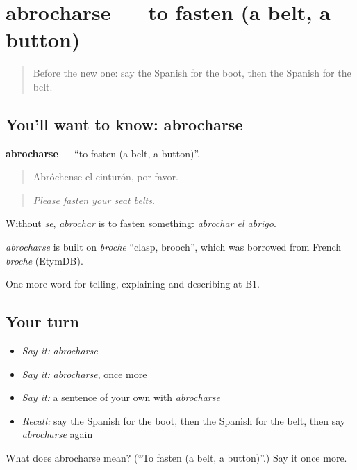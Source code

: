 \section[abrocharse]{abrocharse — to fasten (a belt, a button)}

\label{lesson:ES-C644-abrocharse}



\begin{quote}
Before the new one: say the Spanish for the boot, then the Spanish for the belt.
\end{quote}

\subsection*{You'll want to know: abrocharse}
\textbf{abrocharse} — \textquotedblleft{}to fasten (a belt, a button)\textquotedblright{}.

\begin{quote}
Abróchense el cinturón, por favor.
\end{quote}

\begin{quote}
\emph{Please fasten your seat belts.}
\end{quote}

Without \emph{se}, \emph{abrochar} is to fasten something: \emph{abrochar el abrigo}.

\begin{cousinweb}
\emph{abrocharse} is built on \emph{broche} \textquotedblleft{}clasp, brooch\textquotedblright{}, which was borrowed from French \emph{broche} (EtymDB).
\end{cousinweb}

\begin{grammarlens}[title={What you've built}]
One more word for telling, explaining and describing at B1.
\end{grammarlens}

\subsection*{Your turn}
\begin{itemize}
\raggedright
  \item \emph{Say it:} \emph{abrocharse}
  \item \emph{Say it:} \emph{abrocharse}, once more
  \item \emph{Say it:} a sentence of your own with \emph{abrocharse}
  \item \emph{Recall:} say the Spanish for the boot, then the Spanish for the belt, then say \emph{abrocharse} again
\end{itemize}

\begin{tcolorbox}[breakable,colback=teal!4,colframe=teal!35!black,title={Before you move on}]
What does abrocharse mean? (\textquotedblleft{}To fasten (a belt, a button)\textquotedblright{}.) Say it once more.
\end{tcolorbox}
